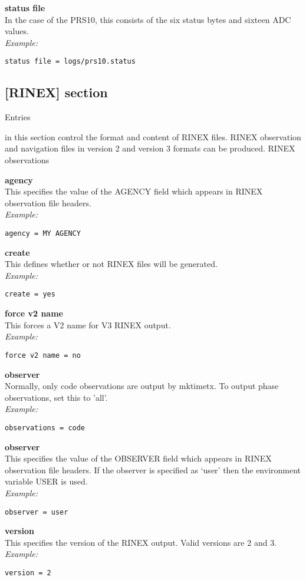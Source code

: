 {\bfseries status file}\\
In the case of the PRS10, this consists of the six status bytes and sixteen ADC values.\\
\textit{Example:}
\begin{lstlisting}
status file = logs/prs10.status
\end{lstlisting}


\subsection{[RINEX] section}

\hypertarget{h:rinex}{Entries} in this section control the format and content of RINEX files.
RINEX observation and navigation files in version 2 and version 3 formats can be produced.
RINEX observations 

{\bfseries agency}\\
This specifies the value of the AGENCY field which appears in RINEX observation file headers.\\
\textit{Example:}
\begin{lstlisting}
agency = MY AGENCY
\end{lstlisting}

{\bfseries create}\\
This defines whether or not RINEX files will be generated.\\
\textit{Example:}
\begin{lstlisting}
create = yes
\end{lstlisting}

{\bfseries force v2 name}\\
This forces a V2 name for V3 RINEX output.\\
\textit{Example:}
\begin{lstlisting}
force v2 name = no
\end{lstlisting}

{\bfseries observer}\\
Normally, only code observations are output by mktimetx. 
To output phase observations, set this to 'all'.\\
\textit{Example:}
\begin{lstlisting}
observations = code
\end{lstlisting}

{\bfseries observer}\\
This specifies the value of the OBSERVER field which appears in RINEX observation file headers.
If the observer is specified as `user' then the environment variable USER is used.\\
\textit{Example:}
\begin{lstlisting}
observer = user
\end{lstlisting}

{\bfseries version}\\
This  specifies the version of the RINEX output. Valid versions are 2 and 3.\\
\textit{Example:}
\begin{lstlisting}
version = 2
\end{lstlisting}


